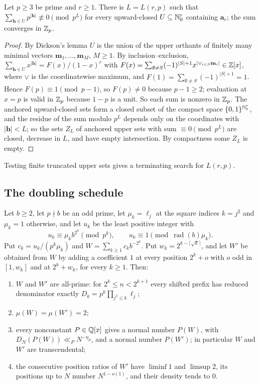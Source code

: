 \documentclass[11pt]{article}
\DeclareMathOperator{\rad}{rad}
\begin{document}
\begin{lemma}\label{lem:upperset}
Let $p\ge3$ be prime and $r\ge1$. There is $L=L(r,p)$ such that $\sum_{\mathbf h\in U}p^{|\mathbf h|}\not\equiv0\pmod{p^L}$ for every upward-closed
$U\subseteq\mathbb N_0^r$ containing $\mathbf a_r$; the sum converges in $\mathbb Z_p$.
\end{lemma}

\begin{proof}
By Dickson's lemma $U$ is the union of the upper orthants of finitely many minimal vectors $\mathbf m_1,\ldots,\mathbf m_M$, $M\ge1$. By
inclusion--exclusion, $\sum_{\mathbf h\in U}x^{|\mathbf h|}=F(x)/(1-x)^r$ with $F(x)=\sum_{\emptyset\ne S}(-1)^{|S|+1}x^{|\vee_{i\in S}\mathbf m_i|}\in\mathbb Z[x]$, where
$\vee$ is the coordinatewise maximum, and $F(1)=\sum_{\emptyset\ne S}(-1)^{|S|+1}=1$. Hence $F(p)\equiv1\pmod{p-1}$, so $F(p)\ne0$ because
$p-1\ge2$; evaluation at $x=p$ is valid in $\mathbb Z_p$ because $1-p$ is a unit. So each sum is nonzero in $\mathbb Z_p$. The anchored upward-closed
sets form a closed subset of the compact space $\{0,1\}^{\mathbb N_0^r}$, and the residue of the sum modulo $p^L$ depends only on the
coordinates with $|\mathbf h|<L$; so the sets $Z_L$ of anchored upper sets with sum $\equiv0\pmod{p^L}$ are closed, decrease in $L$, and
have empty intersection. By compactness some $Z_L$ is empty.
\end{proof}

Testing finite truncated upper sets gives a terminating search for $L(r,p)$.

\subsection{The doubling schedule}

\begin{theorem}\label{thm:doubling}
Let $b\ge2$, let $p\nmid b$ be an odd prime, let $\mu_k=\ell_j$ at the square indices $k=j^2$ and $\mu_k=1$ otherwise, and let
$u_k$ be the least positive integer with
\[
u_k\equiv\mu_kb^{2^k}\pmod{p^k},\qquad u_k\equiv1\pmod{\rad(b)\mu_k}.
\]
Put $c_k=u_k/(p^k\mu_k)$ and $W=\sum_{k\ge1}c_kb^{-2^k}$. Put $w_k=2^{k-\lceil\sqrt k\rceil}$, and let $W'$ be obtained from $W$ by adding a
coefficient $1$ at every position $2^k+o$ with $o$ odd in $[1,w_k]$ and at $2^k+w_k$, for every $k\ge1$. Then:
\begin{enumerate}[label=\textup{(\roman*)},nosep]
\item $W$ and $W'$ are all-prime: for $2^k\le n<2^{k+1}$ every shifted prefix has reduced denominator exactly
$D_k=p^k\prod_{j^2\le k}\ell_j$;
\item $\mu(W)=\mu(W')=2$;
\item every nonconstant $P\in\mathbb Q[x]$ gives a normal number $P(W)$, with $D_N(P(W))\ll_PN^{-\eta_P}$, and a normal number $P(W')$;
in particular $W$ and $W'$ are transcendental;
\item the consecutive position ratios of $W'$ have $\liminf1$ and $\limsup2$, its positions up to $N$ number $N^{1-o(1)}$, and their
density tends to $0$.
\end{enumerate}
\end{theorem}
\end{document}
